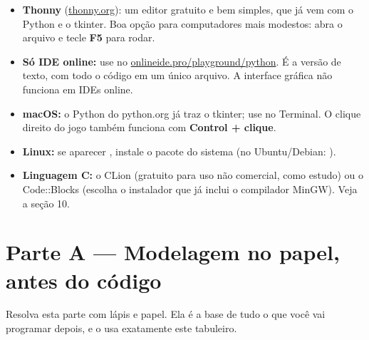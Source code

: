 \documentclass[11pt]{article}
\begin{document}
\begin{itemize}
  \item \textbf{Thonny} (\href{https://thonny.org}{thonny.org}): um editor gratuito e bem simples,
        que já vem com o Python e o tkinter. Boa opção para computadores mais modestos: abra o
        arquivo e tecle \textbf{F5} para rodar.
  \item \textbf{Só IDE online:} use  no
        \href{https://www.onlineide.pro/playground/python}{onlineide.pro/playground/python}. É a
        versão de texto, com todo o código em um único arquivo. A interface gráfica não funciona
        em IDEs online.
  \item \textbf{macOS:} o Python do python.org já traz o tkinter; use  no Terminal.
        O clique direito do jogo também funciona com \textbf{Control + clique}.
  \item \textbf{Linux:} se aparecer , instale o pacote do
        sistema (no Ubuntu/Debian: ).
  \item \textbf{Linguagem C:} o CLion (gratuito para uso não comercial, como estudo) ou o
        Code::Blocks (escolha o instalador que já inclui o compilador MinGW). Veja a seção 10.
\end{itemize}

\section{Parte A — Modelagem no papel, antes do código}

Resolva esta parte com lápis e papel. Ela é a base de tudo o que você vai programar depois,
e o  usa exatamente este tabuleiro.
\end{document}
